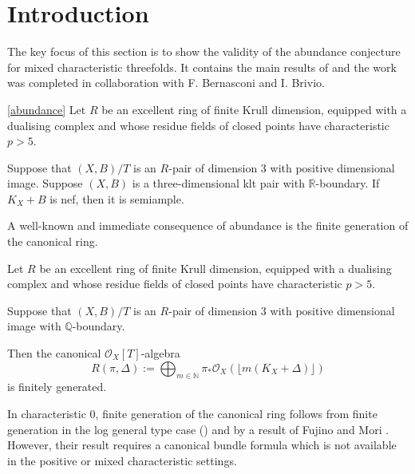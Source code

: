 \documentclass[a4paper,12pt]{book}
\newcommand{\ox}{\mathcal{O}_{X}}
\begin{document}
	\section{Introduction}
	
	The key focus of this section is to show the validity of the abundance conjecture for mixed characteristic threefolds. It contains the main results of \cite{} and the work was completed in collaboration with F. Bernasconi and I. Brivio.
	
	\begin{theorem}\label{Main_Abund1}\autoref{abundance}
		Let $R$ be an excellent ring of finite Krull dimension, equipped with a dualising complex and whose residue fields of closed points have characteristic $p>5$.
		
		Suppose that $(X,B)/T$ is an $R$-pair of dimension $3$ with positive dimensional image.
		Suppose $(X,B)$ is a three-dimensional klt pair with $\mathbb{R}$-boundary. If $K_X+B$ is nef, then it is semiample.
	\end{theorem}

	A well-known and immediate consequence of abundance is the finite generation of the canonical ring.
	
	\begin{theorem}
		Let $R$ be an excellent ring of finite Krull dimension, equipped with a dualising complex and whose residue fields of closed points have characteristic $p>5$.
		
		Suppose that $(X,B)/T$ is an $R$-pair of dimension $3$ with positive dimensional image with $\mathbb{Q}$-boundary. 
		
		Then the canonical $\ox[T]$-algebra
		\[R(\pi,\Delta):=\bigoplus_{m \in \mathbb{N}} \pi_{*}\ox(\lfloor m(K_{X}+\Delta)\rfloor)\]
		is finitely generated.
	\end{theorem}

	In characteristic $0$, finite generation of the canonical ring follows from finite generation in the log general type case (\cite{BCHM10}) and by a result of Fujino and Mori \cite[Theorem 5.2]{FM00}. However, their result requires a canonical bundle formula which is not available in the positive or mixed characteristic settings.
\end{document}
